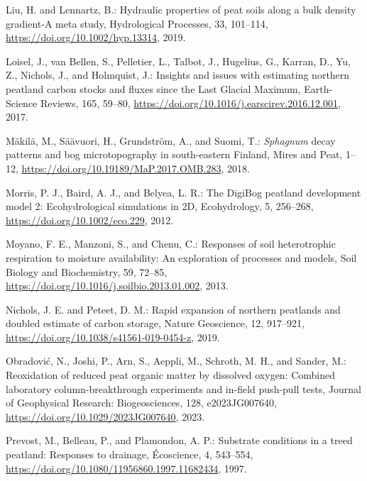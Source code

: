 \documentclass[
  12pt,
]{article}
\newlength{\cslhangindent}
\newlength{\cslentryspacingunit} %
\newenvironment{CSLReferences}[2] %
 {%
  \setlength{\parindent}{0pt}
  \ifodd #1
  \let\oldpar\par
  \def\par{\hangindent=\cslhangindent\oldpar}
  \fi
  \setlength{\parskip}{#2\cslentryspacingunit}
 }%
 {}
\begin{document}
\begin{CSLReferences}{0}{0}
\leavevmode{}%
Liu, H. and Lennartz, B.: Hydraulic properties of peat soils along a bulk density gradient-{A} meta study, Hydrological Processes, 33, 101--114, \url{https://doi.org/10.1002/hyp.13314}, 2019.

\leavevmode{}%
Loisel, J., van Bellen, S., Pelletier, L., Talbot, J., Hugelius, G., Karran, D., Yu, Z., Nichols, J., and Holmquist, J.: Insights and issues with estimating northern peatland carbon stocks and fluxes since the {Last Glacial Maximum}, Earth-Science Reviews, 165, 59--80, \url{https://doi.org/10.1016/j.earscirev.2016.12.001}, 2017.

\leavevmode{}%
Mäkilä, M., Säävuori, H., Grundström, A., and Suomi, T.: {\emph{Sphagnum}} decay patterns and bog microtopography in south-eastern {Finland}, Mires and Peat, 1--12, \url{https://doi.org/10.19189/MaP.2017.OMB.283}, 2018.

\leavevmode{}%
Morris, P. J., Baird, A. J., and Belyea, L. R.: The {DigiBog} peatland development model 2: Ecohydrological simulations in {2D}, Ecohydrology, 5, 256--268, \url{https://doi.org/10.1002/eco.229}, 2012.

\leavevmode{}%
Moyano, F. E., Manzoni, S., and Chenu, C.: Responses of soil heterotrophic respiration to moisture availability: {An} exploration of processes and models, Soil Biology and Biochemistry, 59, 72--85, \url{https://doi.org/10.1016/j.soilbio.2013.01.002}, 2013.

\leavevmode{}%
Nichols, J. E. and Peteet, D. M.: Rapid expansion of northern peatlands and doubled estimate of carbon storage, Nature Geoscience, 12, 917--921, \url{https://doi.org/10.1038/s41561-019-0454-z}, 2019.

\leavevmode{}%
Obradović, N., Joshi, P., Arn, S., Aeppli, M., Schroth, M. H., and Sander, M.: Reoxidation of reduced peat organic matter by dissolved oxygen: {Combined} laboratory column-breakthrough experiments and in-field push-pull tests, Journal of Geophysical Research: Biogeosciences, 128, e2023JG007640, \url{https://doi.org/10.1029/2023JG007640}, 2023.

\leavevmode{}%
Prevost, M., Belleau, P., and Plamondon, A. P.: Substrate conditions in a treed peatland: {Responses} to drainage, {É}coscience, 4, 543--554, \url{https://doi.org/10.1080/11956860.1997.11682434}, 1997.


\end{CSLReferences}
\end{document}
